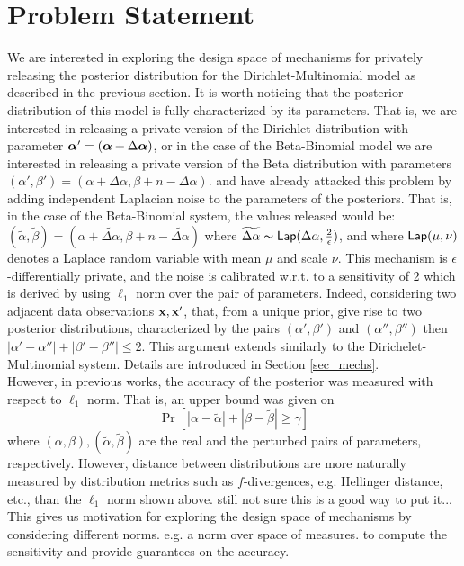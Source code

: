\documentclass{article}
\begin{document}
\section{Problem Statement}
\label{subsec_problem}
We are interested in exploring the design space of mechanisms for privately releasing the posterior
distribution for the Dirichlet-Multinomial model as described in the
previous section.
It is worth noticing that the posterior distribution of this model is fully characterized
by its parameters. That is, we are interested in releasing a private version of
the Dirichlet distribution with parameter
$\boldsymbol{\alpha}'=(\boldsymbol{\alpha} + \Delta \boldsymbol{\alpha})$, or in the case of the
Beta-Binomial model we are interested in releasing a private version of the Beta distribution with 
parameters $(\alpha',\beta')=(\alpha + \Delta \alpha,\beta + n -
\Delta \alpha)$.
\citet{zhang2016differential} and \citet{xiao2012bayesian}
have already attacked this problem by adding independent Laplacian noise to the
parameters of the posteriors. That is, in the case of the Beta-Binomial system,
the values released would be: $(\tilde\alpha,\tilde\beta)=(\alpha +  \widetilde{\Delta \alpha},\beta + n - \widetilde{\Delta \alpha})$
where $\widetilde{\Delta \alpha}\thicksim \mathsf{Lap}(\Delta \alpha, \frac{2}{\epsilon})$,
and where $\mathsf{Lap}(\mu, \nu)$ denotes a Laplace random variable with mean $\mu$ and scale $\nu$.
This mechanism is $\epsilon$-differentially private, and the noise is
calibrated w.r.t. to a sensitivity of 2 which is derived by using
$\ell_1$ norm over the pair of parameters. Indeed, considering two
adjacent data observations $\textbf{x}, \textbf{x}'$, that, from a unique prior, give rise to two posterior
distributions, characterized by the pairs
$(\alpha',\beta')$ and $(\alpha'',\beta'')$ then
$|\alpha'-\alpha''|+|\beta'-\beta''|\leq 2$.
This argument extends similarly to the Dirichelet-Multinomial system. Details are introduced in Section \ref{sec_mechs}.\\
However, in previous works, the accuracy of the posterior was measured with respect to $\ell_1$ norm. That is, an upper bound was given on
\[
  \Pr[|\alpha - \tilde\alpha| + |\beta - \tilde\beta |\geq \gamma ]
\]
where $(\alpha, \beta), (\tilde\alpha,\tilde\beta)$ are the real and the perturbed pairs of parameters, respectively.
However, distance between
distributions are more naturally  measured by distribution
metrics such as $f$-divergences, e.g. Hellinger distance, etc., than the $\ell_1$ norm shown above.
{\color{blue} still not sure this is a good way to put it...}
This gives us motivation for exploring the design space
of mechanisms by considering different norms. e.g. a norm over space of measures.
to compute the sensitivity and provide guarantees on the accuracy.
\end{document}
